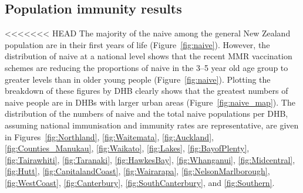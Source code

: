 \documentclass{article}
\begin{document}
\begin{itemize}
\subsection{Population immunity results}

<<<<<<< HEAD
The majority of the naive among the general New Zealand population are in their first years of life (Figure~\ref{fig:naive}). However, the distribution of naive at a national level shows that the recent MMR vaccination schemes are reducing the proportions of naive in the 3--5 year old age group to greater levels than in older young people  (Figure~\ref{fig:naive}). Plotting the breakdown of these figures by DHB clearly shows that the greatest numbers of naive people are in DHBs with larger urban areas (Figure~\ref{fig:naive_map}). The distribution of the numbers of naive and the total naive populations per DHB, assuming national immunisation and immunity rates are representative, are given in Figures~\ref{fig:Northland}, \ref{fig:Waitemata}, \ref{fig:Auckland}, \ref{fig:Counties_Manukau}, \ref{fig:Waikato}, \ref{fig:Lakes}, \ref{fig:BayofPlenty}, \ref{fig:Tairawhiti}, \ref{fig:Taranaki}, \ref{fig:HawkesBay}, \ref{fig:Whanganui}, \ref{fig:Midcentral}, \ref{fig:Hutt}, \ref{fig:CapitalandCoast}, \ref{fig:Wairarapa}, \ref{fig:NelsonMarlborough}, \ref{fig:WestCoast}, \ref{fig:Canterbury}, \ref{fig:SouthCanterbury}, and \ref{fig:Southern}.


\end{itemize}
\end{document}
